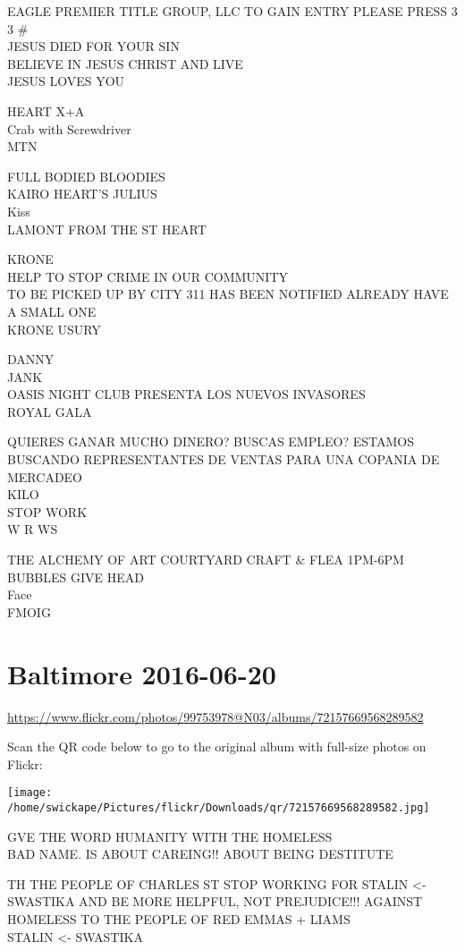 \documentclass[10pt,letterpaper]{article}
\begin{document}
EAGLE PREMIER TITLE GROUP, LLC TO GAIN ENTRY PLEASE PRESS 3 3 \#\\
JESUS DIED FOR YOUR SIN\\
BELIEVE IN JESUS CHRIST AND LIVE\\
JESUS LOVES YOU

HEART X+A\\
Crab with Screwdriver\\
MTN

FULL BODIED BLOODIES\\
KAIRO HEART'S JULIUS\\
Kiss\\
LAMONT FROM THE ST HEART

KRONE\\
HELP TO STOP CRIME IN OUR COMMUNITY\\
TO BE PICKED UP BY CITY 311 HAS BEEN NOTIFIED ALREADY HAVE A SMALL ONE\\
KRONE USURY

DANNY\\
JANK\\
OASIS NIGHT CLUB PRESENTA LOS NUEVOS INVASORES\\
ROYAL GALA

QUIERES GANAR MUCHO DINERO?  BUSCAS EMPLEO?  ESTAMOS BUSCANDO REPRESENTANTES DE VENTAS PARA UNA COPANIA DE MERCADEO\\
KILO\\
STOP WORK\\
W R WS

THE ALCHEMY OF ART COURTYARD CRAFT \& FLEA 1PM{-}6PM\\
BUBBLES GIVE HEAD\\
Face\\
FMOIG
\pagebreak

\section*{Baltimore 2016-06-20}

\url{https://www.flickr.com/photos/99753978@N03/albums/72157669568289582}

Scan the QR code below to go to the original album with full-size photos on Flickr:

\texttt{[image: /home/swickape/Pictures/flickr/Downloads/qr/72157669568289582.jpg]}
\pagebreak

GVE THE WORD HUMANITY WITH THE HOMELESS\\
BAD NAME.  IS ABOUT CAREING!! ABOUT BEING DESTITUTE

TH THE PEOPLE OF CHARLES ST STOP WORKING FOR STALIN <{-} SWASTIKA AND BE MORE HELPFUL, NOT PREJUDICE!!! AGAINST HOMELESS TO THE PEOPLE OF RED EMMAS + LIAMS\\
STALIN <{-} SWASTIKA
\end{document}
